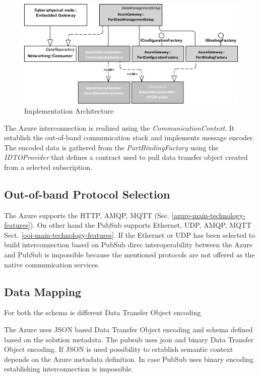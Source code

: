 \documentclass{jacsart}
\begin{document}
\begin{figure}
      \centering
      \includegraphics[width=\textwidth]{../.Media/ImplementationArchitecture.png}
      \caption{Implementation Architecture}\label{figure4.ImplementationArchitecture}
\end{figure}


The Azure interconnection is realized using the \textit{CommunicationContext}. It establish the out-of-band communication stack and implements message encoder. The encoded data is gathered from the \textit{PartBindingFactory} using the \textit{IDTOProvider} that defines a contract used to pull data transfer object created from a selected subscription.

\subsection{Out-of-band Protocol Selection}


The Azure supports the HTTP, AMQP, MQTT (Sec. \ref*{azure-main-technology-features}). On other hand the PubSub supports Ethernet, UDP, AMQP, MQTT {Sect. \ref*{ooi-main-technology-features}}. If the Ethernet or UDP has been selected to build interconnection based on PubSub direc interoperability between the Azure and PubSub is impossible because the mentioned protocols are not offered as the native communication services.

\subsection{Data Mapping}

For both the schema is different Data Transfer Object encoding

The Azure uses JSON based Data Transfer Object encoding and schema defined based on the solution metadata. The pubsub uses json and binary Data Transfer Object encoding. If JSON is used possibility to establish semantic context depends on the Azure metadata definition. In case PubSub uses binary encoding establishing interconnection is impossible.
\end{document}
